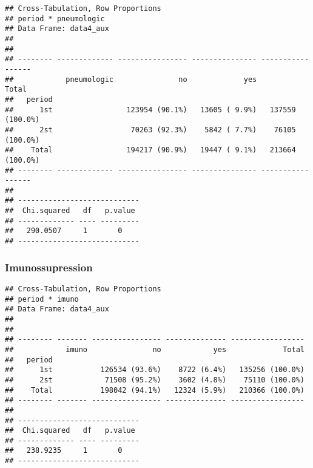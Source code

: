 \documentclass[
]{article}
\newenvironment{Shaded}{\begin{snugshade}}{\end{snugshade}}
\newcommand{\DataTypeTok}[1]{\textcolor[rgb]{0.13,0.29,0.53}{#1}}
\newcommand{\KeywordTok}[1]{\textcolor[rgb]{0.13,0.29,0.53}{\textbf{#1}}}
\newcommand{\NormalTok}[1]{#1}
\newcommand{\OperatorTok}[1]{\textcolor[rgb]{0.81,0.36,0.00}{\textbf{#1}}}
\newcommand{\OtherTok}[1]{\textcolor[rgb]{0.56,0.35,0.01}{#1}}
\newcommand{\StringTok}[1]{\textcolor[rgb]{0.31,0.60,0.02}{#1}}
\begin{document}
\begin{verbatim}
## Cross-Tabulation, Row Proportions  
## period * pneumologic  
## Data Frame: data4_aux  
## 
## 
## -------- ------------- ---------------- --------------- -----------------
##            pneumologic               no             yes             Total
##   period                                                                 
##      1st                 123954 (90.1%)   13605 ( 9.9%)   137559 (100.0%)
##      2st                  70263 (92.3%)    5842 ( 7.7%)    76105 (100.0%)
##    Total                 194217 (90.9%)   19447 ( 9.1%)   213664 (100.0%)
## -------- ------------- ---------------- --------------- -----------------
## 
## ----------------------------
##  Chi.squared   df   p.value 
## ------------- ---- ---------
##   290.0507     1       0    
## ----------------------------
\end{verbatim}

\hypertarget{imunossupression-1}{%
\subsubsection{Imunossupression}\label{imunossupression-1}}

\begin{Shaded}
\end{Shaded}

\begin{verbatim}
## Cross-Tabulation, Row Proportions  
## period * imuno  
## Data Frame: data4_aux  
## 
## 
## -------- ------- ---------------- -------------- -----------------
##            imuno               no            yes             Total
##   period                                                          
##      1st           126534 (93.6%)    8722 (6.4%)   135256 (100.0%)
##      2st            71508 (95.2%)    3602 (4.8%)    75110 (100.0%)
##    Total           198042 (94.1%)   12324 (5.9%)   210366 (100.0%)
## -------- ------- ---------------- -------------- -----------------
## 
## ----------------------------
##  Chi.squared   df   p.value 
## ------------- ---- ---------
##   238.9235     1       0    
## ----------------------------
\end{verbatim}
\end{document}

